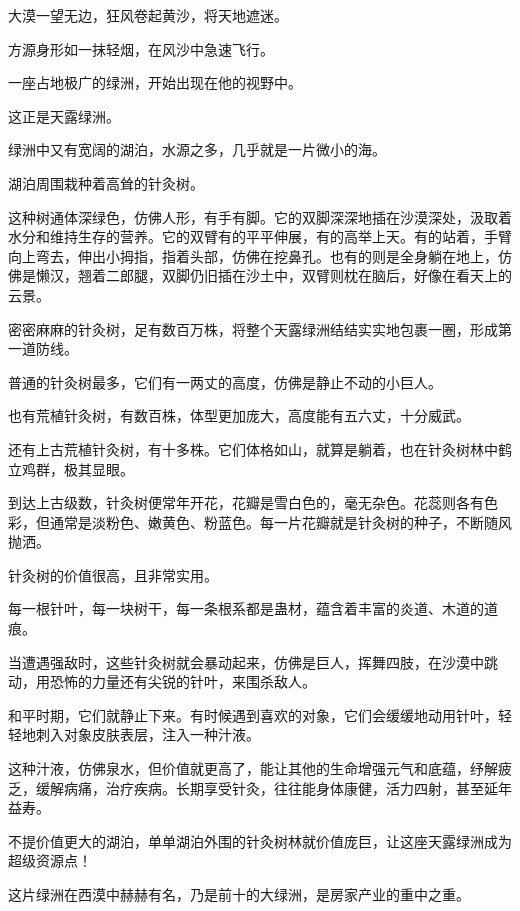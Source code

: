 
\begin{this_body}



大漠一望无边，狂风卷起黄沙，将天地遮迷。

方源身形如一抹轻烟，在风沙中急速飞行。

一座占地极广的绿洲，开始出现在他的视野中。

这正是天露绿洲。

绿洲中又有宽阔的湖泊，水源之多，几乎就是一片微小的海。

湖泊周围栽种着高耸的针灸树。

这种树通体深绿色，仿佛人形，有手有脚。它的双脚深深地插在沙漠深处，汲取着水分和维持生存的营养。它的双臂有的平平伸展，有的高举上天。有的站着，手臂向上弯去，伸出小拇指，指着头部，仿佛在挖鼻孔。也有的则是全身躺在地上，仿佛是懒汉，翘着二郎腿，双脚仍旧插在沙土中，双臂则枕在脑后，好像在看天上的云景。

密密麻麻的针灸树，足有数百万株，将整个天露绿洲结结实实地包裹一圈，形成第一道防线。

普通的针灸树最多，它们有一两丈的高度，仿佛是静止不动的小巨人。

也有荒植针灸树，有数百株，体型更加庞大，高度能有五六丈，十分威武。

还有上古荒植针灸树，有十多株。它们体格如山，就算是躺着，也在针灸树林中鹤立鸡群，极其显眼。

到达上古级数，针灸树便常年开花，花瓣是雪白色的，毫无杂色。花蕊则各有色彩，但通常是淡粉色、嫩黄色、粉蓝色。每一片花瓣就是针灸树的种子，不断随风抛洒。

针灸树的价值很高，且非常实用。

每一根针叶，每一块树干，每一条根系都是蛊材，蕴含着丰富的炎道、木道的道痕。

当遭遇强敌时，这些针灸树就会暴动起来，仿佛是巨人，挥舞四肢，在沙漠中跳动，用恐怖的力量还有尖锐的针叶，来围杀敌人。

和平时期，它们就静止下来。有时候遇到喜欢的对象，它们会缓缓地动用针叶，轻轻地刺入对象皮肤表层，注入一种汁液。

这种汁液，仿佛泉水，但价值就更高了，能让其他的生命增强元气和底蕴，纾解疲乏，缓解病痛，治疗疾病。长期享受针灸，往往能身体康健，活力四射，甚至延年益寿。

不提价值更大的湖泊，单单湖泊外围的针灸树林就价值庞巨，让这座天露绿洲成为超级资源点！

这片绿洲在西漠中赫赫有名，乃是前十的大绿洲，是房家产业的重中之重。


\end{this_body}
